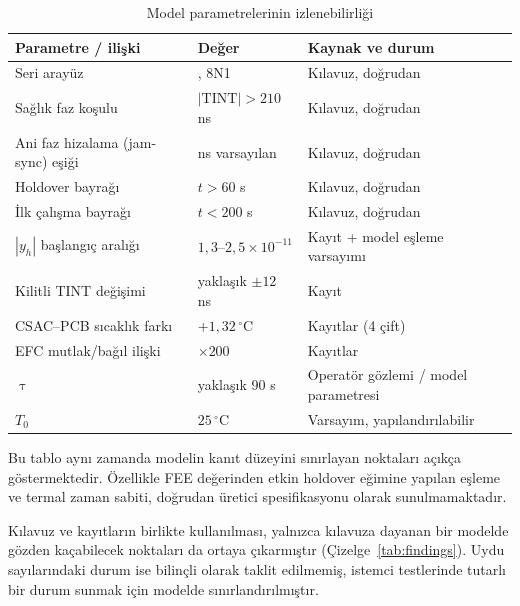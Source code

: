 \documentclass[9pt,twocolumn,a4paper]{extarticle}
\begin{document}
\begin{table}[t]
\caption{Model parametrelerinin izlenebilirliği}
\label{tab:trace}
\centering
\fontsize{9}{10.8}\selectfont
\setlength{\tabcolsep}{3pt}
\begin{tabular}{>{\raggedright\arraybackslash}p{}>{\raggedright\arraybackslash}p{}>{\raggedright\arraybackslash}p{}}
\toprule
\textbf{Parametre / ilişki} & \textbf{Değer} & \textbf{Kaynak ve durum} \\
\midrule
Seri arayüz & 115200, 8N1 & Kılavuz, doğrudan \\
Sağlık faz koşulu & $|\mathrm{TINT}|>210$ ns & Kılavuz, doğrudan \\
Ani faz hizalama (jam-sync) eşiği & 220 ns varsayılan & Kılavuz, doğrudan \\
Holdover bayrağı & $t>60$ s & Kılavuz, doğrudan \\
İlk çalışma bayrağı & $t<200$ s & Kılavuz, doğrudan \\
$|y_h|$ başlangıç aralığı & $1{,}3$--$2{,}5\times10^{-11}$ & Kayıt + model eşleme varsayımı \\
Kilitli TINT değişimi & yaklaşık $\pm12$ ns & Kayıt \\
CSAC--PCB sıcaklık farkı & $+1{,}32\,^{\circ}$C & Kayıtlar (4 çift) \\
EFC mutlak/bağıl ilişki & $\times200$ & Kayıtlar \\
$\uptau$ & yaklaşık 90 s & Operatör gözlemi / model parametresi \\
$T_0$ & $25\,^{\circ}$C & Varsayım, yapılandırılabilir \\
\bottomrule
\end{tabular}
\end{table}

Bu tablo aynı zamanda modelin kanıt düzeyini sınırlayan noktaları açıkça göstermektedir. Özellikle FEE değerinden etkin holdover eğimine yapılan eşleme ve termal zaman sabiti, doğrudan üretici spesifikasyonu olarak sunulmamaktadır.

Kılavuz ve kayıtların birlikte kullanılması, yalnızca kılavuza dayanan bir modelde gözden kaçabilecek noktaları da ortaya çıkarmıştır (Çizelge~\ref{tab:findings}). Uydu sayılarındaki durum ise bilinçli olarak taklit edilmemiş, istemci testlerinde tutarlı bir durum sunmak için modelde sınırlandırılmıştır.
\end{document}
